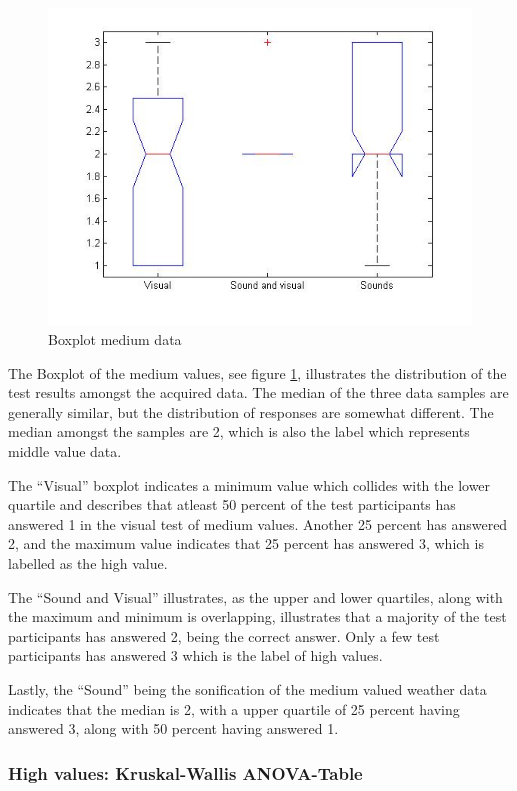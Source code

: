 \begin{figure}[!htbp]
    \centering
    \includegraphics[width=.7\textwidth]{images/Evaluation7.jpg}
    \caption{Boxplot medium data}
    \label{fig:evaluation7}
\end{figure}

The Boxplot of the medium values, see figure \ref{fig:evaluation7}, illustrates the distribution of the test results amongst the acquired data. The median of the three data samples are generally similar, but the distribution of responses are somewhat different. 
The median amongst the samples are 2, which is also the label which represents middle value data.

The \enquote{Visual} boxplot indicates a minimum value which collides with the lower quartile and describes that atleast 50 percent of the test participants has answered 1 in the visual test of medium values. 
Another 25 percent has answered 2, and the maximum value indicates that 25 percent has answered 3, which is labelled as the high value.

The \enquote{Sound and Visual} illustrates, as the upper and lower quartiles, along with the maximum and minimum is overlapping, illustrates that a majority of the test participants has answered 2, being the correct answer. 
Only a few test participants has answered 3 which is the label of high values.

Lastly, the \enquote{Sound} being the sonification of the medium valued weather data indicates that the median is 2, with a upper quartile of 25 percent having answered 3, along with 50 percent having answered 1.


\FloatBarrier
\subsubsection*{High values: Kruskal-Wallis ANOVA-Table} %
\label{ssub:high_values_kruskal_wallis_anova_table}

